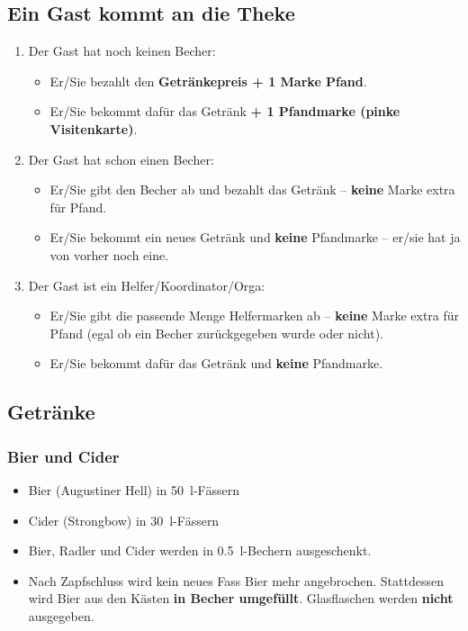 \subsection{Ein Gast kommt an die Theke}
\begin{enumerate}
  \item Der Gast hat noch keinen Becher:
    \begin{itemize}
      \item Er/Sie bezahlt den \textbf{Getränkepreis + 1 Marke Pfand}.
      \item Er/Sie bekommt dafür das Getränk \textbf{+ 1 Pfandmarke (pinke Visitenkarte)}.
    \end{itemize}
  \item Der Gast hat schon einen Becher:
    \begin{itemize}
      \item Er/Sie gibt den Becher ab und bezahlt das Getränk -- \textbf{keine} Marke extra für Pfand.
      \item Er/Sie bekommt ein neues Getränk und \textbf{keine} Pfandmarke -- er/sie hat ja von vorher noch eine.
    \end{itemize}
  \item Der Gast ist ein Helfer/Koordinator/Orga:
    \begin{itemize}
      \item Er/Sie gibt die passende Menge Helfermarken ab -- \textbf{keine} Marke extra für Pfand (egal ob ein Becher zurückgegeben wurde oder nicht).
      \item Er/Sie bekommt dafür das Getränk und \textbf{keine} Pfandmarke.
    \end{itemize}
\end{enumerate}
\subsection{Getränke}
\subsubsection{Bier und Cider}
\begin{itemize}
  \item Bier (Augustiner Hell) in \SI{50}{\litre}-Fässern
  \item Cider (Strongbow) in \SI{30}{\litre}-Fässern
  \item Bier, Radler und Cider werden in \SI{0.5}{\litre}-Bechern ausgeschenkt.
  \item Nach Zapfschluss wird kein neues Fass Bier mehr angebrochen. Stattdessen wird Bier aus den Kästen \textbf{in Becher umgefüllt}. Glasflaschen werden \textbf{nicht} ausgegeben.
\end{itemize}
